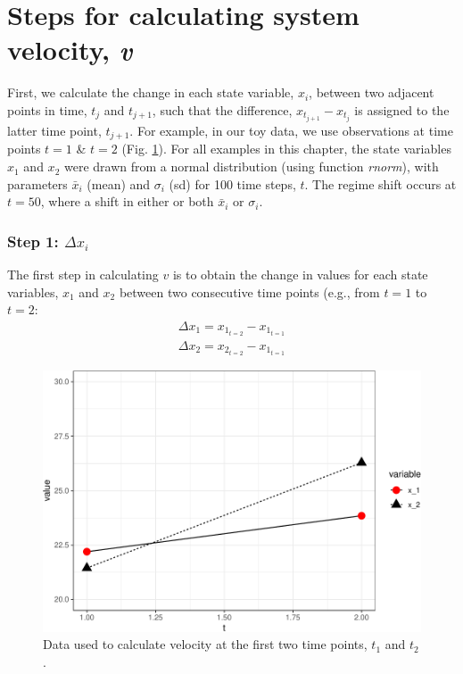 \documentclass[12pt,twoside,openany]{reedthesis}
\begin{document}
\section{\texorpdfstring{Steps for calculating system velocity,
\emph{v}}{Steps for calculating system velocity, v}}\label{steps-for-calculating-system-velocity-v}

First, we calculate the change in each state variable, \(x_i\), between
two adjacent points in time, \(t_j\) and \(t_{j+1}\), such that the
difference, \(x_{t_{j+1}} - x_{t_j}\) is assigned to the latter time
point, \(t_{j+1}\). For example, in our toy data, we use observations at
time points \(t = 1\) \& \(t=2\) (Fig. \ref{fig:sysEx2}). For all
examples in this chapter, the state variables \(x_1\) and \(x_2\) were
drawn from a normal distribution (using function \emph{rnorm}), with
parameters \(\bar{x}_i\) (mean) and \(\sigma_i\) (sd) for 100 time
steps, \(t\). The regime shift occurs at \(t=50\), where a shift in
either or both \(\bar{x}_i\) or \(\sigma_i\).

\subsubsection{\texorpdfstring{Step 1:
\(\Delta x_i\)}{Step 1: \textbackslash{}Delta x\_i}}\label{step-1-delta-x_i}

The first step in calculating \(v\) is to obtain the change in values
for each state variables, \(x_1\) and \(x_2\) between two consecutive
time points (e.g., from \(t=1\) to \(t=2\):
\begin{equation}
\begin{array}{rcr}
\Delta x_1 = x_{1_{t=2}} - x_{1_{t=1}} \\
\Delta x_2 = x_{2_{t=2}} - x_{1_{t=1}}
  \end{array}
\label{eq:diffX}
\end{equation}\begin{figure}
{\centering \includegraphics[width=0.95\linewidth]{_myDissertation_files/figure-latex/sysEx2-1} 

}

\caption{Data used to calculate velocity at the first two time points, $t_1$ and $t_2$.}\label{fig:sysEx2}
\end{figure}
\end{document}
